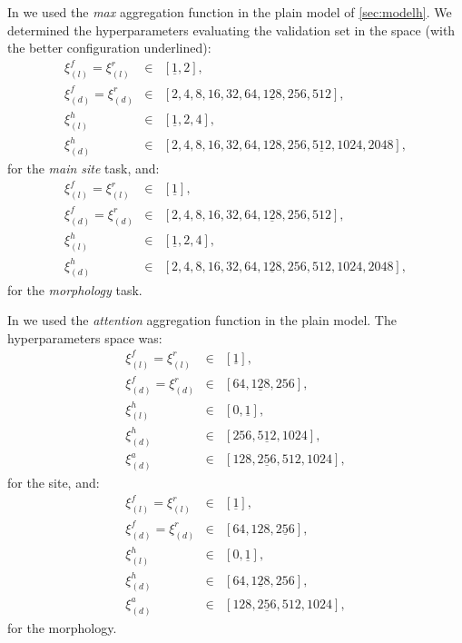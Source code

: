In \maxp{} we used the \emph{max} aggregation
function 
in the plain model of \cref{sec:modelh}. We determined the
hyperparameters evaluating the validation set in the space (with the
better configuration underlined):
\begin{align*}
  \xi_{(l)}^f=\xi_{(l)}^r&\in&[\underline{1},2],\\
  \xi_{(d)}^f=\xi_{(d)}^r&\in&[2,4,8,16,32,64,\underline{128},256,512],\\
  \xi_{(l)}^h&\in&[\underline{1},2,4],\\
  \xi_{(d)}^h&\in&[2,4,8,16,32,64,128,256,\underline{512},1024,2048],
\end{align*}
for the \emph{main site} task, and:
\begin{align*}
  \xi_{(l)}^f=\xi_{(l)}^r&\in&[\underline{1}],\\
  \xi_{(d)}^f=\xi_{(d)}^r&\in&[2,4,8,16,32,64,\underline{128},256,512],\\
  \xi_{(l)}^h&\in&[\underline{1},2,4],\\
  \xi_{(d)}^h&\in&[2,4,8,16,32,64,\underline{128},256,512,1024,2048],
\end{align*}
for the \emph{morphology} task.

In \softmax{} we used the \emph{attention} aggregation function in the
plain model. The hyperparameters
space was:
\begin{align*}
  \xi_{(l)}^f=\xi_{(l)}^r&\in&[\underline{1}],\\
  \xi_{(d)}^f=\xi_{(d)}^r&\in&[64,\underline{128},256],\\
  \xi_{(l)}^h&\in&[0,\underline{1}],\\
  \xi_{(d)}^h&\in&[256,\underline{512},1024],\\
  \xi_{(d)}^a&\in&[128,\underline{256},512,1024],
\end{align*}
for the site, and:
\begin{align*}
  \xi_{(l)}^f=\xi_{(l)}^r&\in&[\underline{1}],\\
  \xi_{(d)}^f=\xi_{(d)}^r&\in&[64,128,\underline{256}],\\
  \xi_{(l)}^h&\in&[0,\underline{1}],\\
  \xi_{(d)}^h&\in&[64,\underline{128},256],\\
  \xi_{(d)}^a&\in&[128,\underline{256},512,1024],
\end{align*}
for the morphology.

